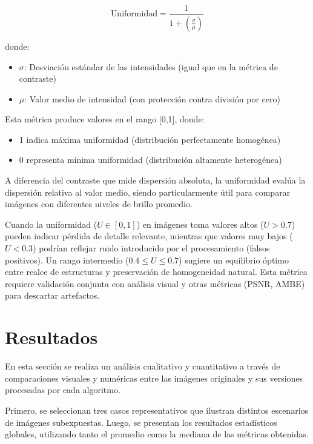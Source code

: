 \documentclass[sigchi]{acmart}
\begin{document}
\begin{equation}
	\text{Uniformidad} = \frac{1}{1 + \left(\frac{\sigma}{\mu}\right)}
\end{equation}

donde:
\begin{itemize}
	\item $\sigma$: Desviación estándar de las intensidades (igual que en la métrica de contraste)
	\item $\mu$: Valor medio de intensidad (con protección contra división por cero)
\end{itemize}

Esta métrica produce valores en el rango [0,1], donde:
\begin{itemize}
	\item 1 indica máxima uniformidad (distribución perfectamente homogénea)
	\item 0 representa mínima uniformidad (distribución altamente heterogénea)
\end{itemize}

A diferencia del contraste que mide dispersión absoluta, la uniformidad evalúa la dispersión
relativa al valor medio, siendo particularmente útil para comparar imágenes con diferentes
niveles de brillo promedio.

Cuando la uniformidad ($U \in [0,1]$) en imágenes toma valores altos
($U > 0.7$) pueden indicar pérdida de detalle relevante, mientras que valores muy bajos ($U <
	0.3$) podrían reflejar ruido introducido por el procesamiento (falsos positivos). Un rango
intermedio ($0.4 \leq U \leq 0.7$) sugiere un equilibrio óptimo entre realce de estructuras y
preservación de homogeneidad natural. Esta métrica requiere validación conjunta con análisis
visual y otras métricas (PSNR, AMBE) para descartar artefactos.

\section{Resultados}
\label{sec:resultados}

En esta sección se realiza un análisis cualitativo y cuantitativo a través de comparaciones
visuales y numéricas entre las imágenes originales y sus versiones procesadas por cada
algoritmo.

Primero, se seleccionan tres casos representativos que ilustran distintos escenarios de
imágenes subexpuestas. Luego, se presentan los resultados estadísticos globales, utilizando
tanto el promedio como la mediana de las métricas obtenidas.
\end{document}
